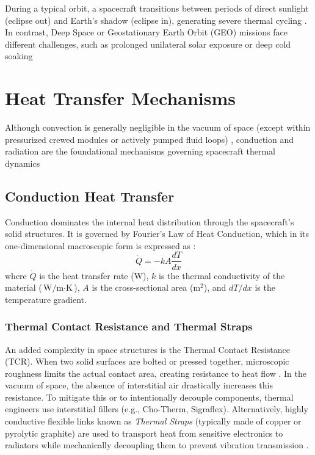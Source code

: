 During a typical orbit, a spacecraft transitions between periods of direct sunlight (eclipse out) and 
Earth's shadow (eclipse in), generating severe thermal cycling \cite{tfg_carol}. In contrast, Deep Space 
or Geostationary Earth Orbit (GEO) missions face different challenges, such as prolonged unilateral solar 
exposure or deep cold soaking %

\section{Heat Transfer Mechanisms}
Although convection is generally negligible in the vacuum of space (except within pressurized crewed 
modules or actively pumped fluid loops) \cite{tcs_slides4}, conduction and radiation are the foundational 
mechanisms governing spacecraft thermal dynamics %

\subsection{Conduction Heat Transfer}
Conduction dominates the internal heat distribution through the spacecraft's solid structures. 
It is governed by Fourier's Law of Heat Conduction, which in its one-dimensional macroscopic form is 
expressed as \cite{tcs_slides1, hmt_f&a}:
\begin{equation}
    \dot{Q} = -k A \frac{dT}{dx}
\end{equation}
where $\dot{Q}$ is the heat transfer rate ($\text{W}$), $k$ is the thermal conductivity of the material
($\text{W/m}\cdot\text{K}$), $A$ is the cross-sectional area ($\text{m}^2$), and $dT/dx$ is the temperature
gradient.

\subsubsection{Thermal Contact Resistance and Thermal Straps}
An added complexity in space structures is the Thermal Contact Resistance (TCR). When two solid 
surfaces are bolted or pressed together, microscopic roughness limits the actual contact area, creating 
resistance to heat flow \cite{tcs_slides3}. In the vacuum of space, the absence of interstitial air drastically
increases this resistance. To mitigate this or to intentionally decouple components, thermal engineers use 
interstitial fillers (e.g., Cho-Therm, Sigraflex). Alternatively, highly conductive flexible 
links known as \textit{Thermal Straps} (typically made of copper or pyrolytic graphite) are used to transport 
heat from sensitive electronics to radiators while mechanically decoupling them to prevent vibration 
transmission \cite{tcs_slides3, tcs_slides0}.


